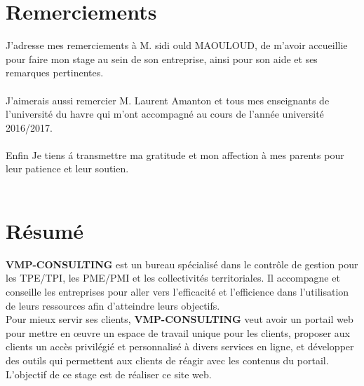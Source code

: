 \documentclass[12pt]{article}
\begin{document}
\section*{Remerciements}


J’adresse mes remerciements à  M. sidi ould MAOULOUD, de m’avoir accueillie pour faire mon
stage au sein de son entreprise, ainsi pour son aide et  ses  remarques pertinentes.  \\ \\
J’aimerais aussi remercier M. Laurent Amanton  et tous mes enseignants de l’université du havre
qui m’ont accompagné 
au cours de l'année université 2016/2017.\\ \\

Enfin  Je tiens á transmettre ma gratitude et mon affection à mes
parents  pour leur patience et leur soutien.\\ \\


\newpage

\section*{Résumé}
\textbf{VMP-CONSULTING}  est un bureau spécialisé dans le contrôle de gestion pour les TPE/TPI, les PME/PMI et les collectivités territoriales. Il  accompagne et conseille les entreprises pour aller vers l'efficacité et l'efficience dans l'utilisation de leurs ressources afin d'atteindre leurs objectifs.\\
Pour mieux servir ses clients, \textbf{VMP-CONSULTING}  veut avoir un portail web pour 
mettre en œuvre un espace de travail unique pour les clients, 
 proposer aux clients un accès privilégié et personnalisé à divers services en
ligne, et 
développer des outils qui permettent aux clients de réagir avec les contenus du
portail.\\
L'objectif de ce stage est de réaliser ce site web.
\end{document}
